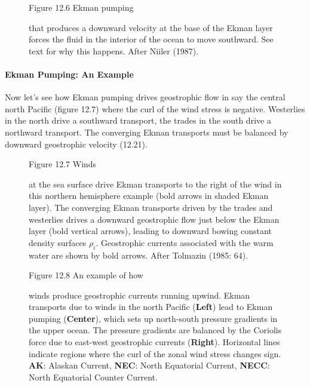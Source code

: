\begin{figure}[t]
{}
\footnotesize
Figure 12.6 Ekman pumping \rule{0pt}{2ex} that
produces a downward velocity at the base of the Ekman layer forces the
fluid in the interior of the ocean to move southward. See text for why
this happens. After Niiler (1987).

\label{fig:vorticity}
\vfill
\vspace{-3ex}
\end{figure}

\paragraph{Ekman Pumping: An Example}
Now let's see how Ekman pumping drives
geostrophic flow in say
the central north Pacific (figure 12.7) where the curl of the wind
stress is negative. Westerlies in the north
drive a southward transport,
the trades in the south drive a northward
transport. The converging Ekman
transports must be balanced by downward geostrophic velocity (12.21).

\begin{figure}[t]
\footnotesize
Figure 12.7 Winds \rule{0pt}{5ex} at the sea surface drive Ekman
transports to the right of the wind in this
northern hemisphere example (bold arrows in shaded Ekman layer). The
converging Ekman transports driven by the trades and westerlies drives
a downward geostrophic flow just below the Ekman layer (bold vertical
arrows), leading to downward bowing constant density surfaces
$\rho_i$. Geostrophic currents associated with the warm water are
shown by bold arrows. After Tolmazin (1985: 64).
\label{fig:EkmanPumping}
\vspace{-4ex}
\end{figure}

\begin{figure}[b!]
\vspace{-3ex}
\footnotesize
Figure 12.8 An example of how \rule{0pt}{5ex}winds produce geostrophic
currents running upwind. Ekman transports due
to winds in the north Pacific (\textbf{Left}) lead to Ekman
pumping (\textbf{Center}), which sets up
north-south pressure gradients in the upper ocean. The pressure
gradients are balanced by the Coriolis force due to east-west
geostrophic currents
(\textbf{Right}). Horizontal lines indicate regions where the curl of
the zonal wind stress changes
sign. \textbf{AK}: Alaskan Current, \textbf{NEC}: North Equatorial
Current, \textbf{NECC}: North Equatorial Counter Current.
\label{fig:zonalmeanwinds}
\vfill
\end{figure}

